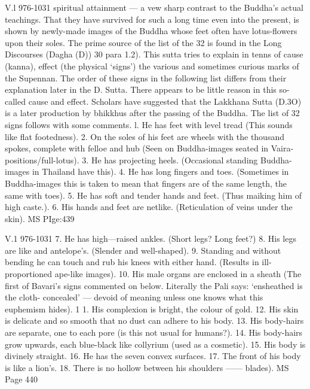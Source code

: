    V.l 976-1031
   spiritual attainment — a vew sharp contrast to the Buddha's actual teachings.
   That they have survived for such a long time even into the present, is shown by
   newly-made images of the Buddha whose feet often have lotus-ﬂowers upon their
   soles. The prime source of the list of the 32 is found in the Long Discourses
   (Dagha (D)) 30 para 1.2). This sutta tries to explain in tenns of cause (kanna),
   effect (the physical `signs') the various and sometimes curious marks of the
   Supennan. The order of these signs in the following list differs from their
   explanation later in the D. Sutta. There appears to be little reason in this so-
   called cause and effect. Scholars have suggested that the Lakkhana Sutta (D.3O)
   is a later production by bhikkhus after the passing of the Buddha.
   The list of 32 signs follows with some comments.
   l. He has feet with level tread (This sounds like ﬂat footedness).
   2. On the soles of his feet are wheels with the thousand spokes, complete with
   felloe and hub (Seen on Buddha-images seated in Vaira-positions/full-lotus).
   3. He has projecting heels. (Occasional standing Buddha-images in Thailand
   have this).
   4. He has long ﬁngers and toes. (Sometimes in Buddha-images this is taken to
   mean that ﬁngers are of the same length, the same with toes).
   5. He has soft and tender hands and feet. (Thus maiking him of high caste.).
   6. His hands and feet are netlike. (Reticulation of veins under the skin).
   MS PIge:439
   
   
   
   V.1 976-1031
   7. He has high—raised ankles. (Short legs? Long feet?)
   8. His legs are like and antelope's. (Slender and well-shaped).
   9. Standing and without bending he can touch and rub his knees with either
   hand. (Results in ill-proportioned ape-like images).
   10. His male organs are enclosed in a sheath (The ﬁrst of Bavari's signs
   commented on below. Literally the Pali says: `ensheathed is the cloth-
   concealed' — devoid of meaning unless one knows what this euphemism
   hides).
   1 1. His complexion is bright, the colour of gold.
   12. His skin is delicate and so smooth that no dust can adhere to his body.
   13. His body-hairs are separate, one to each pore (is this not usual for
   humans?).
   14. His body-hairs grow upwards, each blue-black like collyrium (used as a
   cosmetic).
   15. His body is divinely straight.
   16. He has the seven convex surfaces.
   17. The front of his body is like a lion's.
   18. There is no hollow between his shoulders —— blades).
   MS Page 440
   
